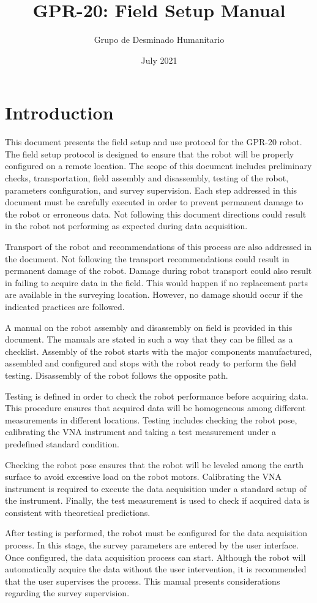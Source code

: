 \documentclass{article}
\title{GPR-20: Field Setup Manual}
\author{Grupo de Desminado Humanitario}
\date{July 2021}
\begin{document}


\newpage
\section{Introduction}
This document presents the field setup and use protocol for the GPR-20 robot. The field setup protocol is designed to ensure that the robot will be properly configured on a remote location. The scope of this document includes preliminary checks, transportation, field assembly and disassembly, testing of the robot, parameters configuration, and survey supervision. Each step addressed in this document must be carefully executed in order to prevent permanent damage to the robot or erroneous data. Not following this document directions could result in the robot not performing as expected during data acquisition. 

Transport of the robot and recommendations of this process are also addressed in the document. Not following the transport recommendations could result in permanent damage of the robot. Damage during robot transport could also result in failing to acquire data in the field. This would happen if no replacement parts are available in the surveying location. However, no damage should occur if the indicated practices are followed. 

A manual on the robot assembly and disassembly on field is provided in this document. The manuals are stated in such a way that they can be filled as a checklist. Assembly of the robot starts with the major components manufactured, assembled and configured and stops with the robot ready to perform the field testing. Disassembly of the robot follows the opposite path. 

Testing is defined in order to check the robot performance before acquiring data. This procedure ensures that acquired data will be homogeneous among different measurements in different locations. Testing includes checking the robot pose, calibrating the VNA instrument and taking a test measurement under a predefined standard condition. 

Checking the robot pose ensures that the robot will be leveled among the earth surface to avoid excessive load on the robot motors. Calibrating the VNA instrument is required to execute the data acquisition under a standard setup of the instrument. Finally, the test measurement is used to check if acquired data is consistent with theoretical predictions.

After testing is performed, the robot must be configured for the data acquisition process. In this stage, the survey parameters are entered by the user interface. Once configured, the data acquisition process can start. Although the robot will automatically acquire the data without the user intervention, it is recommended that the user supervises the process. This manual presents considerations regarding the survey supervision.
\end{document}

